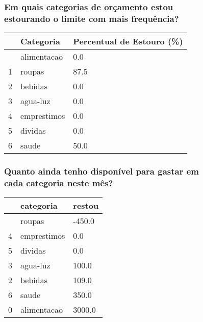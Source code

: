 \documentclass[
  8pt,
  a4paper,
  DIV=11,
  numbers=noendperiod]{scrartcl}
\begin{document}
\begin{figure}

\begin{minipage}{0.50\linewidth}

\subsubsection{Em quais categorias de orçamento estou estourando o
limite com mais
frequência?}\label{em-quais-categorias-de-oruxe7amento-estou-estourando-o-limite-com-mais-frequuxeancia}

\begin{longtable}[]{@{}lll@{}}
\toprule\noalign{}
& Categoria & Percentual de Estouro (\%) \\
\midrule\noalign{}
\endhead
\bottomrule\noalign{}
\endlastfoot
0 & alimentacao & 0.0 \\
1 & roupas & 87.5 \\
2 & bebidas & 0.0 \\
3 & agua-luz & 0.0 \\
4 & emprestimos & 0.0 \\
5 & dividas & 0.0 \\
6 & saude & 50.0 \\
\end{longtable}

\end{minipage}%
%
\begin{minipage}{0.50\linewidth}

\subsubsection{Quanto ainda tenho disponível para gastar em cada
categoria neste
mês?}\label{quanto-ainda-tenho-disponuxedvel-para-gastar-em-cada-categoria-neste-muxeas}

\begin{longtable}[]{@{}lll@{}}
\toprule\noalign{}
& categoria & restou \\
\midrule\noalign{}
\endhead
\bottomrule\noalign{}
\endlastfoot
1 & roupas & -450.0 \\
4 & emprestimos & 0.0 \\
5 & dividas & 0.0 \\
3 & agua-luz & 100.0 \\
2 & bebidas & 109.0 \\
6 & saude & 350.0 \\
0 & alimentacao & 3000.0 \\
\end{longtable}

\end{minipage}%

\end{figure}%
\end{document}
